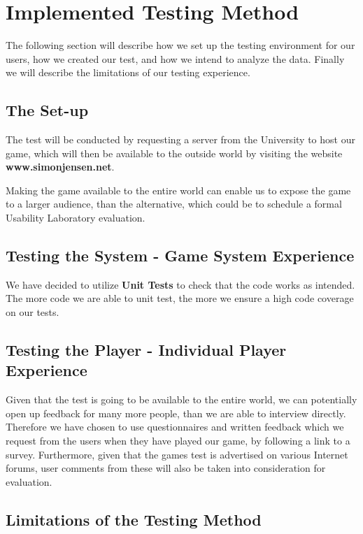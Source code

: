 \section{Implemented Testing Method}
\label{sec:test_method}

The following section will describe how we set up the testing environment for our users, how we created our test, and how we intend to analyze the data.
Finally we will describe the limitations of our testing experience.

\subsection{The Set-up}

The test will be conducted by requesting a server from the University to host our game, which will then be available to the outside world by visiting the website \textbf{www.simonjensen.net}.

Making the game available to the entire world can enable us to expose the game to a larger audience, than the alternative, which could be to schedule a formal Usability Laboratory evaluation.

\subsection{Testing the System - Game System Experience}

We have decided to utilize \textbf{Unit Tests} to check that the code works as intended.
The more code we are able to unit test, the more we ensure a high code coverage on our tests.

\subsection{Testing the Player - Individual Player Experience}

Given that the test is going to be available to the entire world, we can potentially open up feedback for many more people, than we are able to interview directly. Therefore we have chosen to use questionnaires and written feedback which we request from the users when they have played our game, by following a link to a survey. Furthermore, given that the games test is advertised on various Internet forums, user comments from these will also be taken into consideration for evaluation.

\subsection{Limitations of the Testing Method}

